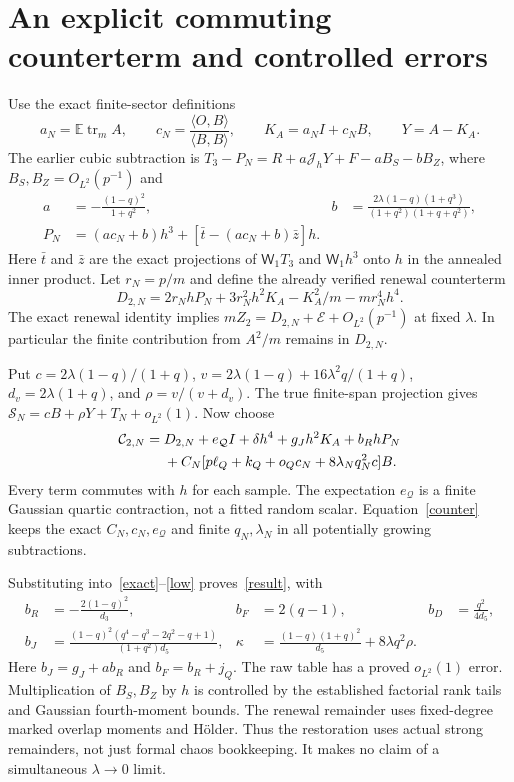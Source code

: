 \documentclass[11pt,a4paper]{article}
\newcommand{\EE}{\mathbb E}
\newcommand{\tr}{\operatorname{tr}}
\newcommand{\W}[1]{\mathsf W_{#1}}
\newcommand{\Jh}{\mathcal J_h}
\begin{document}
\newpage
\section{An explicit commuting counterterm and controlled errors}
Use the exact finite-sector definitions
\begin{equation}
 a_N=\EE\tr_mA,\qquad
 c_N=\frac{\langle O,B\rangle}{\langle B,B\rangle},\qquad
 K_A=a_NI+c_NB,\qquad Y=A-K_A.
\end{equation}
The earlier cubic subtraction is $T_3-P_N=R+a\Jh Y+F-aB_S-bB_Z$,
where $B_S,B_Z=O_{L^2}(p^{-1})$ and
\begin{align}
 a&=-\frac{(1-q)^2}{1+q^2},&
 b&=\frac{2\lambda(1-q)(1+q^3)}{(1+q^2)(1+q+q^2)},\\
 P_N&=(ac_N+b)h^3+[\bar t-(ac_N+b)\bar z]h.
\end{align}
Here $\bar t$ and $\bar z$ are the exact projections of
$\W1T_3$ and $\W1h^3$ onto $h$ in the annealed inner product.
Let $r_N=p/m$ and define the already verified renewal counterterm
\begin{equation}
 D_{2,N}=2r_NhP_N+3r_N^2h^2K_A-K_A^2/m-mr_N^4h^4.
\end{equation}
The exact renewal identity implies
$mZ_2=D_{2,N}+\mathcal E+O_{L^2}(p^{-1})$ at fixed $\lambda$.
In particular the finite contribution from $A^2/m$ remains in $D_{2,N}$.

Put $c=2\lambda(1-q)/(1+q)$,
$v=2\lambda(1-q)+16\lambda^2q/(1+q)$,
$d_v=2\lambda(1+q)$, and $\rho=v/(v+d_v)$.
The true finite-span projection gives
$\mathcal S_N=cB+\rho Y+T_N+o_{L^2}(1)$.
Now choose
\begin{align}
 \mathcal C_{2,N}={}&D_{2,N}+e_{\mathcal Q}I+\delta h^4
        +g_Jh^2K_A+b_RhP_N\notag\\
 &+C_N[p\ell_Q+k_Q+o_Qc_N+8\lambda_Nq_N^2c]B. \label{counter}
\end{align}
Every term commutes with $h$ for each sample. The expectation
$e_{\mathcal Q}$ is a finite Gaussian quartic contraction, not a
fitted random scalar. Equation~\eqref{counter} keeps the exact
$C_N,c_N,e_{\mathcal Q}$ and finite $q_N,\lambda_N$ in all
potentially growing subtractions.

Substituting into~\eqref{exact}--\eqref{low} proves~\eqref{result}, with
\begin{align}
 b_R&=-\frac{2(1-q)^2}{d_3},& b_F&=2(q-1),&b_D&=\frac{q^2}{4d_5},\\
 b_J&=\frac{(1-q)^2(q^4-q^3-2q^2-q+1)}{(1+q^2)d_5},&
 \kappa&=\frac{(1-q)(1+q)^2}{d_5}+8\lambda q^2\rho.
\end{align}
Here $b_J=g_J+ab_R$ and $b_F=b_R+j_Q$.
The raw table has a proved $o_{L^2}(1)$ error. Multiplication of
$B_S,B_Z$ by $h$ is controlled by the established factorial rank
tails and Gaussian fourth-moment bounds. The renewal remainder
uses fixed-degree marked overlap moments and H\"older. Thus the
restoration uses actual strong remainders, not just formal chaos
bookkeeping. It makes no claim of a simultaneous $\lambda\to0$ limit.
\end{document}
